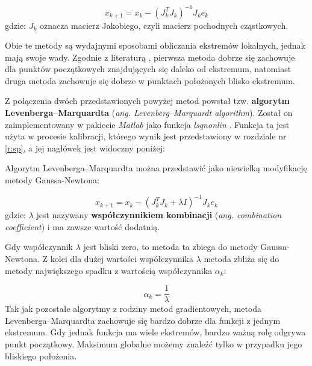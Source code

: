 \documentclass{pracamgr}
\begin{document}
\begin{equation}
  x_{k+1} = x_k - (J_k^TJ_k)^{-1}J_k e_k
\end{equation}
gdzie: $J_k$ oznacza macierz Jakobiego, czyli macierz pochodnych cząstkowych.

Obie te metody są wydajnymi sposobami obliczania ekstremów lokalnych, jednak mają swoje wady.
Zgodnie z literaturą \cite{LM}, pierwsza metoda dobrze się zachowuje dla punktów początkowych 
znajdujących się daleko od ekstremum, natomiast druga metoda zachowuje się dobrze w punktach 
położonych blisko ekstremum. 

Z połączenia dwóch przedstawionych powyżej metod powstał tzw. \textbf{algorytm Levenberga–Marquardta} 
(\textit{ang. Levenberg–Marquardt algorithm}). Został on zaimplementowany w pakiecie \textit{Matlab} 
jako funkcja \textit{lsqnonlin} \cite{NonLinear}. Funkcja ta jest użyta w procesie 
kalibracji, którego wynik jest przedstawiony w rozdziale nr \ref{r:sp}, a jej nagłówek 
jest widoczny poniżej:


Algorytm Levenberga–Marquardta można przedstawić jako niewielką modyfikację metody Gaussa-Newtona:


\begin{equation} 
  x_{k+1} = x_k - (J_k^TJ_k + \lambda I)^{-1}J_k e_k
\end{equation}
gdzie: $\lambda$ jest nazywany 
\textbf{współczynnikiem kombinacji} (\textit{ang. combination coefficient}) i 
ma zawsze wartość dodatnią.

Gdy współczynnik $\lambda$ jest bliski zero, to metoda ta zbiega do metody Gaussa-Newtona. 
Z kolei dla dużej wartości współczynnika $\lambda$ metoda zbliża się do metody największego spadku
z wartością współczynnika $\alpha_k$:

\begin{equation}
  \alpha_k = \frac{1}{\lambda}
\end{equation}
Tak jak pozostałe algorytmy z rodziny metod gradientowych, metoda Levenberga–Marquardta zachowuje się
bardzo dobrze dla funkcji z jednym ekstremum. Gdy jednak funkcja ma wiele ekstremów, bardzo ważną
rolę odgrywa punkt początkowy. Maksimum globalne możemy znaleźć tylko w przypadku jego bliskiego
położenia.
\end{document}
